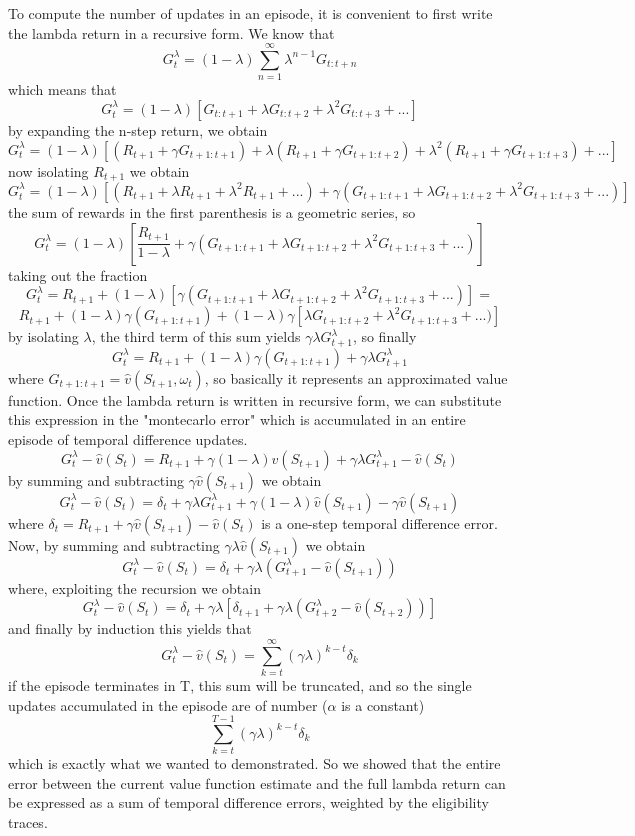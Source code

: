 \documentclass[12pt,a4paper]{extarticle}
\begin{document}
To compute the number of updates in an episode, it is convenient to first write the lambda return in a recursive form. We know that \[G_t^{\lambda} = (1-\lambda)\sum_{n=1}^{\infty} \lambda^{n-1} G_{t:t+n}\] which means that \[ G_t^{\lambda} = (1-\lambda)[G_{t:t+1}+\lambda G_{t:t+2} + \lambda^2 G_{t:t+3} + ...]\] by expanding the n-step return, we obtain
\[ G_t^{\lambda} = (1-\lambda)[(R_{t+1} + \gamma G_{t+1:t+1})+ \lambda (R_{t+1} + \gamma G_{t+1:t+2}) + \lambda^2 (R_{t+1} + \gamma G_{t+1:t+3}) + ...]\] now isolating $R_{t+1}$ we obtain \[ G_t^{\lambda} = (1-\lambda)[(R_{t+1} + \lambda R_{t+1} + \lambda^2 R_{t+1} + ...) + \gamma (G_{t+1:t+1}+ \lambda G_{t+1:t+2} + \lambda^2 G_{t+1:t+3} + ...)]\] the sum of rewards in the first parenthesis is a geometric series, so \[ G_t^{\lambda} = (1-\lambda)[\frac{R_{t+1}}{1-\lambda} + \gamma (G_{t+1:t+1}+ \lambda G_{t+1:t+2} + \lambda^2 G_{t+1:t+3} + ...)]\] taking out the fraction \[ G_t^{\lambda} = R_{t+1} + (1-\lambda)[\gamma (G_{t+1:t+1}+ \lambda G_{t+1:t+2} + \lambda^2 G_{t+1:t+3} + ...)] = \]\[R_{t+1} + (1-\lambda)\gamma (G_{t+1:t+1}) + (1-\lambda)\gamma[\lambda G_{t+1:t+2} + \lambda^2 G_{t+1:t+3} + ...)]\] by isolating $\lambda$, the third term of this sum yields $\gamma \lambda G_{t+1}^\lambda$, so finally \[G_{t}^\lambda = R_{t+1} + (1-\lambda)\gamma (G_{t+1:t+1}) +  \gamma \lambda G_{t+1}^\lambda\] where $G_{t+1:t+1} = \hat{v}(S_{t+1},\omega_{t})$, so basically it represents an approximated value function. Once the lambda return is written in recursive form, we can substitute this expression in the "montecarlo error" which is accumulated in an entire episode of temporal difference updates. \[G_t^\lambda - \hat{v}(S_t) = R_{t+1} + \gamma(1-\lambda)\hat{v}(S_{t+1}) +  \gamma \lambda G_{t+1}^\lambda - \hat{v}(S_t)\] by summing and subtracting $\gamma \hat{v}(S_{t+1})$ we obtain \[G_t^\lambda - \hat{v}(S_t) = \delta_t + \gamma \lambda G_{t+1}^\lambda + \gamma(1-\lambda)\hat{v}(S_{t+1}) - \gamma \hat{v}(S_{t+1})\] where $\delta_t = R_{t+1} + \gamma \hat{v}(S_{t+1}) - \hat{v}(S_t)$ is a one-step temporal difference error. Now, by summing and subtracting $\gamma\lambda\hat{v}(S_{t+1})$ we obtain \[G_t^\lambda - \hat{v}(S_t) = \delta_t + \gamma \lambda (G_{t+1}^\lambda - \hat{v}(S_{t+1}))\] where, exploiting the recursion we obtain \[G_{t}^\lambda - \hat{v}(S_{t}) = \delta_t + \gamma  \lambda[\delta_{t+1} + \gamma \lambda (G_{t+2}^\lambda - \hat{v}(S_{t+2}))]\] and finally by induction this yields that \[G_{t}^\lambda - \hat{v}(S_{t}) = \sum_{k=t}^\infty (\gamma \lambda)^{k-t} \delta_k\] if the episode terminates in T, this sum will be truncated, and so the single updates accumulated in the episode are of number ($\alpha$ is a constant) \[\sum_{k=t}^{T-1} (\gamma \lambda)^{k-t} \delta_k\] which is exactly what we wanted to demonstrated. So we showed that the entire error between the current value function estimate and the full lambda return can be expressed as a sum of temporal difference errors, weighted by the eligibility traces.
\end{document}
